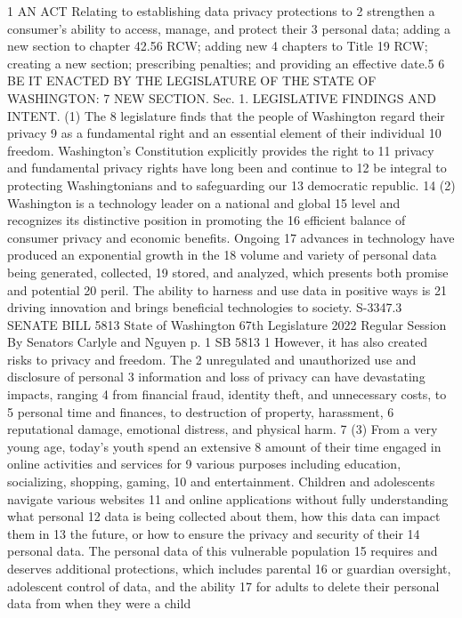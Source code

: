 1 AN ACT Relating to establishing data privacy protections to
2 strengthen a consumer's ability to access, manage, and protect their
3 personal data; adding a new section to chapter 42.56 RCW; adding new
4 chapters to Title 19 RCW; creating a new section; prescribing
penalties; and providing an effective date.5
6 BE IT ENACTED BY THE LEGISLATURE OF THE STATE OF WASHINGTON:
7 NEW SECTION. Sec. 1. LEGISLATIVE FINDINGS AND INTENT. (1) The
8 legislature finds that the people of Washington regard their privacy
9 as a fundamental right and an essential element of their individual
10 freedom. Washington's Constitution explicitly provides the right to
11 privacy and fundamental privacy rights have long been and continue to
12 be integral to protecting Washingtonians and to safeguarding our
13 democratic republic.
14 (2) Washington is a technology leader on a national and global
15 level and recognizes its distinctive position in promoting the
16 efficient balance of consumer privacy and economic benefits. Ongoing
17 advances in technology have produced an exponential growth in the
18 volume and variety of personal data being generated, collected,
19 stored, and analyzed, which presents both promise and potential
20 peril. The ability to harness and use data in positive ways is
21 driving innovation and brings beneficial technologies to society.
S-3347.3
SENATE BILL 5813
State of Washington 67th Legislature 2022 Regular Session
By Senators Carlyle and Nguyen
p. 1 SB 5813
1 However, it has also created risks to privacy and freedom. The
2 unregulated and unauthorized use and disclosure of personal
3 information and loss of privacy can have devastating impacts, ranging
4 from financial fraud, identity theft, and unnecessary costs, to
5 personal time and finances, to destruction of property, harassment,
6 reputational damage, emotional distress, and physical harm.
7 (3) From a very young age, today's youth spend an extensive
8 amount of their time engaged in online activities and services for
9 various purposes including education, socializing, shopping, gaming,
10 and entertainment. Children and adolescents navigate various websites
11 and online applications without fully understanding what personal
12 data is being collected about them, how this data can impact them in
13 the future, or how to ensure the privacy and security of their
14 personal data. The personal data of this vulnerable population
15 requires and deserves additional protections, which includes parental
16 or guardian oversight, adolescent control of data, and the ability
17 for adults to delete their personal data from when they were a child
